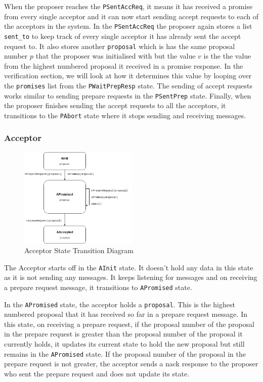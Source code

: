 When the proposer reaches the \texttt{PSentAccReq}, it means it has received a promise
from every single acceptor and it can now start sending accept requests to each
of the acceptors in the system. In the \texttt{PSentAccReq} the proposer again stores
a list \texttt{sent\_to} to keep track of every single acceptor it has already sent the
accept request to. It also stores another \texttt{proposal} which is has the same
proposal number $p$ that the proposer was initialised with but the value $v$ is the
the value from the highest numbered proposal it received in a promise response.
In the verification section, we will look at how it determines this value by looping over
the \texttt{promises} list from the \texttt{PWaitPrepResp} state. The sending of
accept requests works similar to sending prepare requests in the
\texttt{PSentPrep} state. Finally, when the proposer finishes sending the
accept requests to all the acceptors, it transitions to the \texttt{PAbort}
state where it stops sending and receiving messages.


\subsubsection{Acceptor}
\begin{figure}
\centering
\includegraphics[width=0.5\textwidth]{figures/acceptor_state_transitions.png}
\caption{Acceptor State Transition Diagram
\label{fig:myInlineFigure}}
\end{figure}

The Acceptor starts off in the \texttt{AInit} state. It doesn't hold any data
in this state as it is not sending any messages. It keeps listening for messages
and on receiving a prepare request message, it transitions to \texttt{APromised}
state.

In the \texttt{APromised} state, the acceptor holds a \texttt{proposal}. This is
the highest numbered proposal that it has received so far in a prepare request
message. In this state, on receiving a prepare request, if the proposal number
of the proposal in the prepare request is greater than the proposal number of
the proposal it currently holds, it updates its current state to hold the new
proposal but still remains in the \texttt{APromised} state. If the proposal
number of the proposal in the prepare request is not greater, the acceptor
sends a nack response to the proposer who sent the prepare request and does not
update its state.

